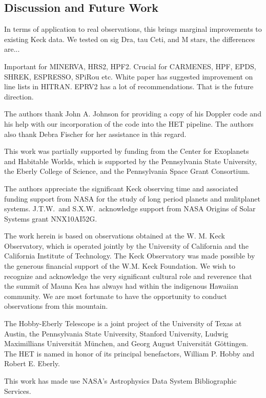 \documentclass{emulateapj}
\begin{document}
\begin{CJK*}{UTF8}{gbsn}
\section{Discussion and Future Work}\label{sec:future}

In terms of application to real observations, this brings marginal
improvements to existing Keck data. We tested on sig Dra, tau Ceti,
and M stars, the differences are...

Important for MINERVA, HRS2, HPF2. Crucial for CARMENES, HPF, EPDS, SHREK,
ESPRESSO, SPiRou etc. White paper has suggested improvement on line
lists in HITRAN. EPRV2 has a lot of recommendations. That is the
future direction.



\acknowledgements
The authors thank John A. Johnson for providing a copy of his Doppler
code and his help with our incorporation of the code into the HET
pipeline.  The authors also thank Debra Fischer for her assistance in
this regard.

This work was partially supported by funding from the Center for
Exoplanets and Habitable Worlds, which is supported by the
Pennsylvania State University, the Eberly College of Science, and the
Pennsylvania Space Grant Consortium.

The authors appreciate the significant Keck observing time and
associated funding support from NASA for the study of long period
planets and mulitplanet systems.
%
J.T.W.\ and S.X.W.\ acknowledge support from NASA Origins of Solar
Systems grant NNX10AI52G.

The work herein is based on observations obtained at the W. M. Keck
Observatory, which is operated jointly by the University of California
and the California Institute of Technology.  The Keck Observatory was
made possible by the generous financial support of the W.M. Keck
Foundation.  We wish to recognize and acknowledge the very significant
cultural role and reverence that the summit of Mauna Kea has always
had within the indigenous Hawaiian community.  We are most fortunate
to have the opportunity to conduct observations from this mountain.

The Hobby-Eberly Telescope is a joint project of the University of
Texas at Austin, the Pennsylvania State University, Stanford
University, Ludwig Maximillians Universit\"at M\"unchen, and Georg
August Universit\"at G\"ottingen. The HET is named in honor of its
principal benefactors, William P. Hobby and Robert E. Eberly.

This work has made use NASA’s Astrophysics Data System Bibliographic Services.


\end{CJK*}


\end{document}
